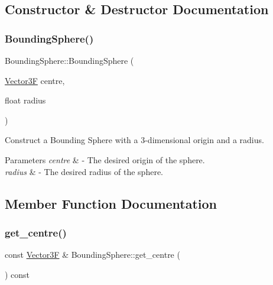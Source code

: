 \subsection{Constructor \& Destructor Documentation}
\mbox{\label{class_bounding_sphere_a9d6fd19a13a3ec6106254640591a26b8}} 
\subsubsection{\texorpdfstring{Bounding\+Sphere()}{BoundingSphere()}}
{\footnotesize\ttfamily Bounding\+Sphere\+::\+Bounding\+Sphere (\begin{DoxyParamCaption}\item[{\mbox{\hyperlink{class_vector3}{Vector3F}}}]{centre,  }\item[{float}]{radius }\end{DoxyParamCaption})}

Construct a Bounding Sphere with a 3-\/dimensional origin and a radius. 
\begin{DoxyParams}{Parameters}
{\em centre} & -\/ The desired origin of the sphere. \\
\hline
{\em radius} & -\/ The desired radius of the sphere. \\
\hline
\end{DoxyParams}


\subsection{Member Function Documentation}
\mbox{\label{class_bounding_sphere_a8d81f5c646d752821c356742819ff512}} 
\subsubsection{\texorpdfstring{get\+\_\+centre()}{get\_centre()}}
{\footnotesize\ttfamily const \mbox{\hyperlink{class_vector3}{Vector3F}} \& Bounding\+Sphere\+::get\+\_\+centre (\begin{DoxyParamCaption}{ }\end{DoxyParamCaption}) const}

